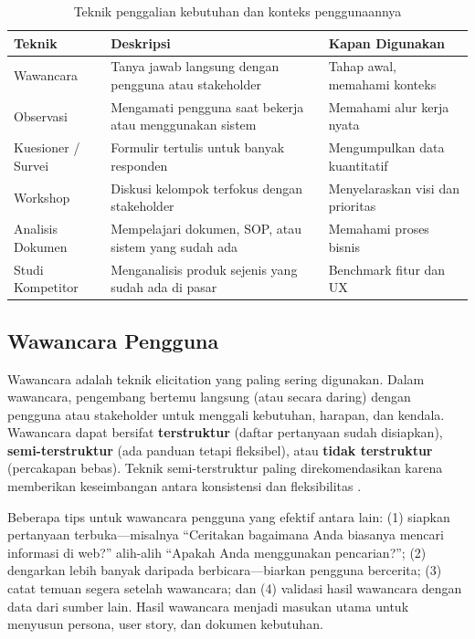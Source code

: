 \begin{table}[H]
\centering
\begin{tabular}{|P{3.5cm}|P{4.5cm}|P{4cm}|}
\hline
\textbf{Teknik} & \textbf{Deskripsi} & \textbf{Kapan Digunakan} \\
\hline
Wawancara & Tanya jawab langsung dengan pengguna atau stakeholder & Tahap awal, memahami konteks \\
\hline
Observasi & Mengamati pengguna saat bekerja atau menggunakan sistem & Memahami alur kerja nyata \\
\hline
Kuesioner / Survei & Formulir tertulis untuk banyak responden & Mengumpulkan data kuantitatif \\
\hline
Workshop & Diskusi kelompok terfokus dengan stakeholder & Menyelaraskan visi dan prioritas \\
\hline
Analisis Dokumen & Mempelajari dokumen, SOP, atau sistem yang sudah ada & Memahami proses bisnis \\
\hline
Studi Kompetitor & Menganalisis produk sejenis yang sudah ada di pasar & Benchmark fitur dan UX \\
\hline
\end{tabular}
\caption{Teknik penggalian kebutuhan dan konteks penggunaannya}
\end{table}

\subsection{Wawancara Pengguna}

Wawancara adalah teknik elicitation yang paling sering digunakan. Dalam wawancara, pengembang bertemu langsung (atau secara daring) dengan pengguna atau stakeholder untuk menggali kebutuhan, harapan, dan kendala. Wawancara dapat bersifat \textbf{terstruktur} (daftar pertanyaan sudah disiapkan), \textbf{semi-terstruktur} (ada panduan tetapi fleksibel), atau \textbf{tidak terstruktur} (percakapan bebas). Teknik semi-terstruktur paling direkomendasikan karena memberikan keseimbangan antara konsistensi dan fleksibilitas \cite{nngroup}.

Beberapa tips untuk wawancara pengguna yang efektif antara lain: (1) siapkan pertanyaan terbuka---misalnya ``Ceritakan bagaimana Anda biasanya mencari informasi di web?'' alih-alih ``Apakah Anda menggunakan pencarian?''; (2) dengarkan lebih banyak daripada berbicara---biarkan pengguna bercerita; (3) catat temuan segera setelah wawancara; dan (4) validasi hasil wawancara dengan data dari sumber lain. Hasil wawancara menjadi masukan utama untuk menyusun persona, user story, dan dokumen kebutuhan.

